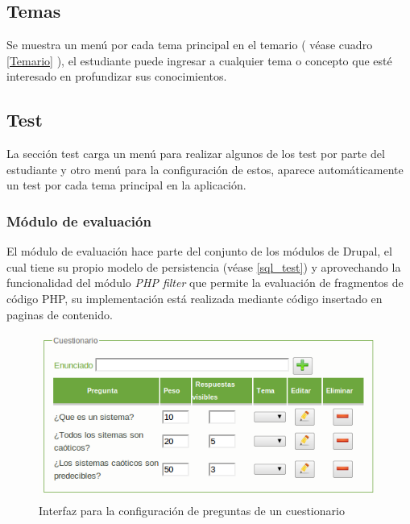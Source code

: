\documentclass[letterpaper, 11pt, oneside]{article}
\theoremstyle{definition}
\theoremstyle{remark}
\begin{document}
\subsection{Temas}

Se muestra un menú por cada tema principal en el temario ( véase cuadro \ref{Temario} ), el estudiante puede ingresar a cualquier tema o concepto que esté interesado en profundizar sus conocimientos.

\subsection{Test}

La sección test carga un menú para realizar algunos de los test por parte del estudiante y otro menú para la configuración de estos, aparece automáticamente un test por cada tema principal en la aplicación.  

\clearpage
\newpage
\subsubsection{Módulo de evaluación}

El módulo de evaluación hace parte del conjunto de los módulos de Drupal, el cual tiene su propio modelo de persistencia (véase \ref{sql_test}) y aprovechando la funcionalidad del módulo \textit{PHP filter} que permite la evaluación de fragmentos de código PHP, su implementación está realizada mediante código insertado en paginas de contenido.

\begin{figure}[h] 
\begin{center}
\includegraphics[width=12cm,clip]{Imagenes/config_pregunta.png}
\end{center}
\caption{Interfaz para la configuración de preguntas de un cuestionario}
\label{config_pregunta}
\end{figure}
\end{document}
